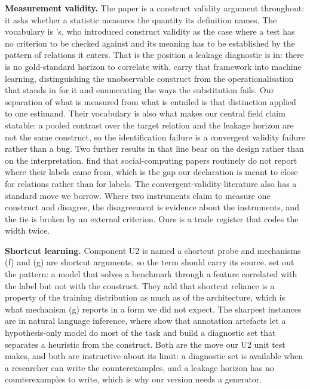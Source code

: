 \documentclass[twoside,11pt]{article}
\begin{document}
\textbf{Measurement validity.} The paper is a construct validity argument throughout: it asks whether a statistic measures the quantity its definition names. The vocabulary is \citet{cronbach}'s, who introduced construct validity as the case where a test has no criterion to be checked against and its meaning has to be established by the pattern of relations it enters. That is the position a leakage diagnostic is in: there is no gold-standard horizon to correlate with. \citet{jacobs} carry that framework into machine learning, distinguishing the unobservable construct from the operationalisation that stands in for it and enumerating the ways the substitution fails. Our separation of what is measured from what is entailed is that distinction applied to one estimand. Their vocabulary is also what makes our central field claim statable: a pooled contrast over the target relation and the leakage horizon are not the same construct, so the identification failure is a convergent validity failure rather than a bug. Two further results in that line bear on the design rather than on the interpretation. \citet{geiger} find that social-computing papers routinely do not report where their labels came from, which is the gap our declaration is meant to close for relations rather than for labels. The convergent-validity literature also has a standard move we borrow. Where two instruments claim to measure one construct and disagree, the disagreement is evidence about the instruments, and the tie is broken by an external criterion. Ours is a trade register that codes the width twice.

\textbf{Shortcut learning.} Component U2 is named a shortcut probe and mechanisms (f) and (g) are shortcut arguments, so the term should carry its source. \citet{geirhos} set out the pattern: a model that solves a benchmark through a feature correlated with the label but not with the construct. They add that shortcut reliance is a property of the training distribution as much as of the architecture, which is what mechanism (g) reports in a form we did not expect. The sharpest instances are in natural language inference, where \citet{gururangan} show that annotation artefacts let a hypothesis-only model do most of the task and \citet{mccoy} build a diagnostic set that separates a heuristic from the construct. Both are the move our U2 unit test makes, and both are instructive about its limit: a diagnostic set is available when a researcher can write the counterexamples, and a leakage horizon has no counterexamples to write, which is why our version needs a generator.
\end{document}
